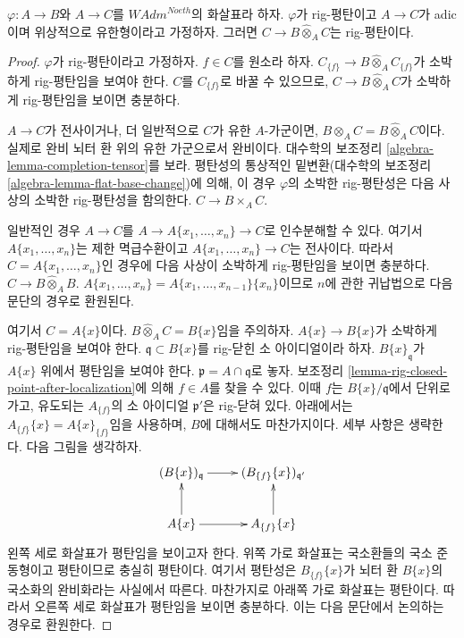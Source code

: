 \begin{lemma}
\label{lemma-rig-flat-base-change}
$\varphi : A \to B$와 $A \to C$를 $\textit{WAdm}^{Noeth}$의 화살표라 하자.
$\varphi$가 rig-평탄이고 $A \to C$가 adic이며 위상적으로 유한형이라고 가정하자.
그러면 $C \to B \widehat{\otimes}_A C$는 rig-평탄이다.
\end{lemma}

\begin{proof}
$\varphi$가 rig-평탄이라고 가정하자. $f \in C$를 원소라 하자.
$C_{\{f\}} \to B \widehat{\otimes}_A C_{\{f\}}$가
소박하게 rig-평탄임을 보여야 한다. $C$를 $C_{\{f\}}$로 바꿀 수 있으므로,
$C \to B \widehat{\otimes}_A C$가 소박하게 rig-평탄임을 보이면 충분하다.

\medskip\noindent
$A \to C$가 전사이거나, 더 일반적으로 $C$가 유한 $A$-가군이면,
$B \otimes_A C = B \widehat{\otimes}_A C$이다. 실제로 완비 뇌터 환 위의
유한 가군으로서 완비이다. 대수학의 보조정리
\ref{algebra-lemma-completion-tensor}를 보라.
평탄성의 통상적인 밑변환(대수학의 보조정리
\ref{algebra-lemma-flat-base-change})에 의해, 이 경우 $\varphi$의 소박한
rig-평탄성은 다음 사상의 소박한 rig-평탄성을 함의한다.
$C \to B \times_A C$.

\medskip\noindent
일반적인 경우 $A \to C$를
$A \to A\{x_1, \ldots, x_n\} \to C$로 인수분해할 수 있다.
여기서 $A\{x_1, \ldots, x_n\}$는 제한 멱급수환이고
$A\{x_1, \ldots, x_n\} \to C$는 전사이다. 따라서
$C = A\{x_1, \ldots, x_n\}$인 경우에 다음 사상이 소박하게
rig-평탄임을 보이면 충분하다.
$C \to B \widehat{\otimes}_A B$.
$A\{x_1, \ldots, x_n\} = A\{x_1, \ldots, x_{n - 1}\}\{x_n\}$이므로
$n$에 관한 귀납법으로 다음 문단의 경우로 환원된다.

\medskip\noindent
여기서 $C = A\{x\}$이다. $B \widehat{\otimes}_A C = B\{x\}$임을 주의하자.
$A\{x\} \to B\{x\}$가 소박하게 rig-평탄임을 보여야 한다.
$\mathfrak q \subset B\{x\}$를 rig-닫힌 소 아이디얼이라 하자.
$B\{x\}_{\mathfrak q}$가 $A\{x\}$ 위에서 평탄임을 보여야 한다.
$\mathfrak p = A \cap \mathfrak q$로 놓자.
보조정리 \ref{lemma-rig-closed-point-after-localization}에 의해
$f \in A$를 찾을 수 있다. 이때 $f$는 $B\{x\}/\mathfrak q$에서 단위로 가고,
유도되는 $A_{\{f\}}$의 소 아이디얼 $\mathfrak p'$은 rig-닫혀 있다.
아래에서는
$A_{\{f\}}\{x\} = A\{x\}_{\{f\}}$임을 사용하며, $B$에 대해서도 마찬가지이다.
세부 사항은 생략한다. 다음 그림을 생각하자.
$$
\xymatrix{
(B\{x\})_{\mathfrak q} \ar[r] &
(B_{\{f\}}\{x\})_{\mathfrak q'} \\
A\{x\} \ar[r] \ar[u] &
A_{\{f\}}\{x\} \ar[u]
}
$$
왼쪽 세로 화살표가 평탄임을 보이고자 한다.
위쪽 가로 화살표는 국소환들의 국소 준동형이고 평탄이므로 충실히 평탄이다.
여기서 평탄성은 $B_{\{f\}}\{x\}$가 뇌터 환 $B\{x\}$의 국소화의
완비화라는 사실에서 따른다. 마찬가지로 아래쪽 가로 화살표는 평탄이다.
따라서 오른쪽 세로 화살표가 평탄임을 보이면 충분하다.
이는 다음 문단에서 논의하는 경우로 환원한다.


\end{proof}
